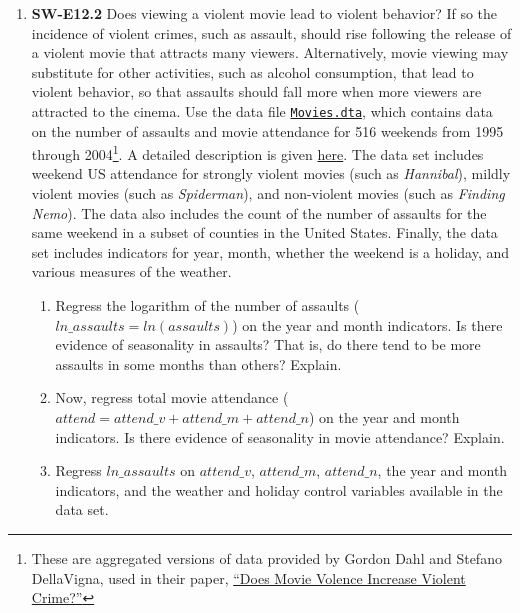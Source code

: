 \documentclass[
]{article}
\begin{document}
\begin{enumerate}
\def\labelenumi{\arabic{enumi}.}
\setcounter{enumi}{5}
\item
  \textbf{SW-E12.2} Does viewing a violent movie lead to violent
  behavior? If so the incidence of violent crimes, such as assault,
  should rise following the release of a violent movie that attracts
  many viewers. Alternatively, movie viewing may substitute for other
  activities, such as alcohol consumption, that lead to violent
  behavior, so that assaults should fall more when more viewers are
  attracted to the cinema. Use the data file
  \href{../materials/Movies.dta}{\texttt{Movies.dta}}, which contains data on the
  number of assaults and movie attendance for 516 weekends from 1995
  through 2004\footnote{These are aggregated versions of data provided
    by Gordon Dahl and Stefano DellaVigna, used in their paper,
    \href{https://eml.berkeley.edu//~sdellavi/wp/moviescrime08-08-01Forthc.pdf}{``Does
    Movie Volence Increase Violent Crime?''}}. A detailed description is
  given \href{../materials/movies_description.pdf}{here}. The data set
  includes weekend US attendance for strongly violent movies (such as
  \emph{Hannibal}), mildly violent movies (such as \emph{Spiderman}),
  and non-violent movies (such as \emph{Finding Nemo}). The data also
  includes the count of the number of assaults for the same weekend in a
  subset of counties in the United States. Finally, the data set
  includes indicators for year, month, whether the weekend is a holiday,
  and various measures of the weather.

  \begin{enumerate}
  \def\labelenumii{\alph{enumii}.}
  \item
    Regress the logarithm of the number of assaults
    (\(ln\_assaults= ln(assaults)\)) on the year and month indicators.
    Is there evidence of seasonality in assaults? That is, do there tend
    to be more assaults in some months than others? Explain.
  \item
    Now, regress total movie attendance
    (\(attend = attend\_v + attend\_m + attend\_n\)) on the year and
    month indicators. Is there evidence of seasonality in movie
    attendance? Explain.
  \item
    Regress \(ln\_assaults\) on \(attend\_v\), \(attend\_m\),
    \(attend\_n\), the year and month indicators, and the weather and
    holiday control variables available in the data set.


\end{enumerate}
\end{enumerate}
\end{document}
